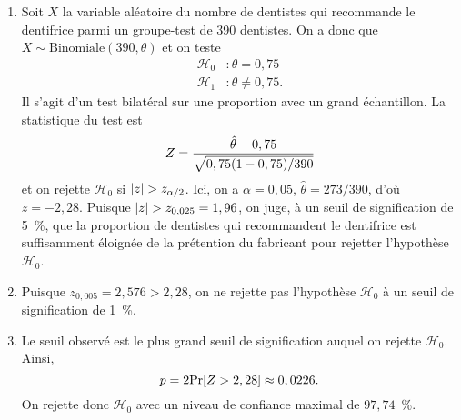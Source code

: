 \begin{solution}{6.8}
    \begin{enumerate}
    \item Soit $X$ la variable aléatoire du nombre de dentistes qui
      recommande le dentifrice parmi un groupe-test de 390 dentistes.
      On a donc que $X \sim \text{Binomiale}(390, \theta)$ et on teste
      \begin{align*}
         \mathcal{H}_0 &: \theta = 0,75 \\
         \mathcal{H}_1 &: \theta \ne 0,75.
      \end{align*}
      Il s'agit d'un test bilatéral sur une proportion avec un grand
      échantillon. La statistique du test est
      \begin{displaymath}
        Z = \frac{\hat{\theta} - 0,75}{%
          \sqrt{0,75 (1 - 0,75)/390}}
      \end{displaymath}
      et on rejette $ \mathcal{H}_0$ si $\lvert z \rvert > z_{\alpha/2}$. Ici, on a
      $\alpha = 0,05$, $\hat{\theta} = 273/390$, d'où $z = -2,28$.
      Puisque $\lvert z \rvert > z_{0,025} = 1,96$, on juge, à un seuil de
      signification de 5~\%, que la proportion de dentistes qui
      recommandent le dentifrice est suffisamment éloignée de la
      prétention du fabricant pour rejetter l'hypothèse $ \mathcal{H}_0$.

    \item Puisque $z_{0,005} = 2,576 > 2,28$, on ne rejette pas
      l'hypothèse  $ \mathcal{H}_0$ à un seuil de signification de 1~\%.
    \item Le seuil observé est le plus grand seuil de signification auquel on
      rejette $ \mathcal{H}_0$. Ainsi,
      \begin{equation*}
        p = 2 \mathrm{Pr} [ Z > 2,28 ] \approx 0,0226.
      \end{equation*}
      On rejette donc $ \mathcal{H}_0$ avec un niveau de confiance maximal de
      $97,74$~\%. %
    \end{enumerate}
  
\end{solution}
